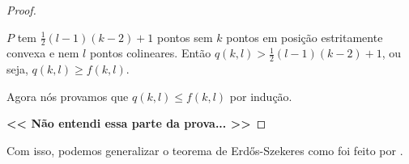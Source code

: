 \begin{proof}
\begin{center}
    \end{center}

    $P$ tem $\frac{1}{2}(l-1)(k-2)+1$ pontos sem $k$ pontos em posição estritamente convexa e nem $l$ pontos colineares. Então $q(k,l)>\frac{1}{2}(l-1)(k-2)+1$, ou seja, $q(k,l)\geq f(k,l)$.

    Agora nós provamos que $q(k,l)\leq f(k,l)$ por indução.

    \textbf {<< Não entendi essa parte da prova... >>}

\end{proof}

Com isso, podemos generalizar o teorema de Erd\H os-Szekeres como foi feito por \cite{pentagon}.

